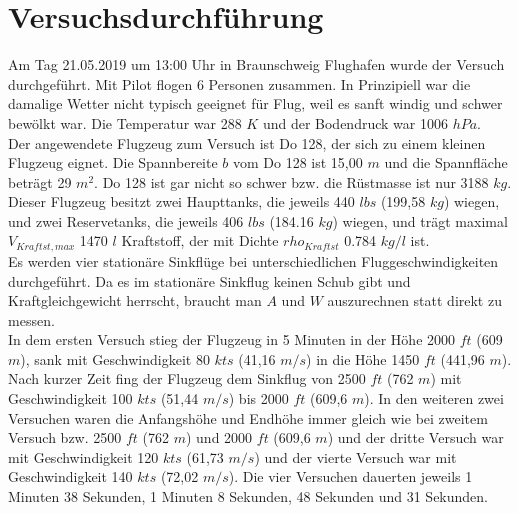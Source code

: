 \chapter{Versuchsdurchführung}
\label{chapter:versuch}
Am Tag 21.05.2019 um 13:00 Uhr in Braunschweig Flughafen wurde der Versuch durchgeführt. Mit Pilot flogen 6 Personen zusammen. In Prinzipiell war die damalige Wetter nicht typisch geeignet für Flug, weil es  sanft windig und schwer bewölkt war. Die Temperatur war 288 $K$ und der Bodendruck war 1006 $hPa$. \\
Der angewendete Flugzeug zum Versuch ist Do 128, der sich zu einem kleinen Flugzeug eignet. Die Spannbereite $b$ vom Do 128 ist 15,00 $m$ und die Spannfläche beträgt 29 ${m}^{2}$. Do 128 ist gar nicht so schwer bzw. die Rüstmasse ist nur 3188 $kg$. Dieser Flugzeug besitzt zwei Haupttanks, die jeweils 440 $lbs$ (199,58 $kg$) wiegen, und zwei Reservetanks, die jeweils 406 $lbs$ (184.16 $kg$) wiegen, und trägt maximal $V_{Kraftst,max}$ 1470 $l$ Kraftstoff, der mit Dichte $rho_{Kraftst}$ 0.784 $kg/l$ ist. \\
Es werden vier stationäre Sinkflüge bei unterschiedlichen Fluggeschwindigkeiten durchgeführt. Da  es im stationäre Sinkflug keinen Schub gibt und Kraftgleichgewicht herrscht, braucht man $A$ und $W$ auszurechnen statt direkt zu messen. \\
In dem ersten Versuch stieg der Flugzeug in 5 Minuten in der Höhe 2000 $ft$ (609 $m$), sank mit Geschwindigkeit 80 $kts$ (41,16 $m/s$) in die Höhe 1450 $ft$ (441,96 $m$). Nach kurzer Zeit fing der Flugzeug dem Sinkflug von 2500 $ft$ (762 $m$) mit Geschwindigkeit 100 $kts$ (51,44 $m/s$) bis 2000 $ft$ (609,6 $m$). In den weiteren zwei Versuchen waren die Anfangshöhe und Endhöhe immer gleich wie bei zweitem Versuch bzw. 2500 $ft$ (762 $m$) und 2000 $ft$ (609,6 $m$) und der dritte Versuch war mit Geschwindigkeit 120 $kts$ (61,73 $m/s$) und der vierte Versuch war mit Geschwindigkeit 140 $kts$ (72,02 $m/s$). Die vier Versuchen dauerten jeweils 1 Minuten 38 Sekunden, 1 Minuten 8 Sekunden, 48 Sekunden und 31 Sekunden.

\newpage
